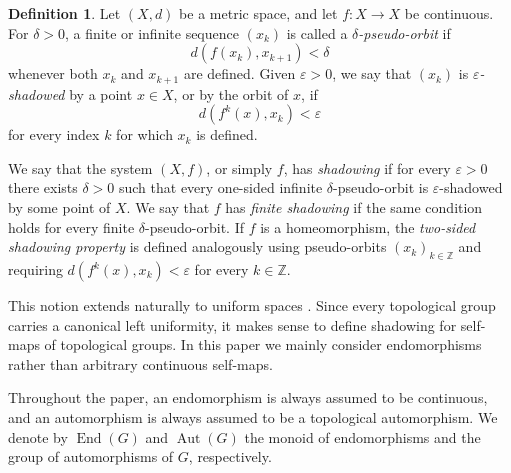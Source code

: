 \documentclass[12pt]{amsart}
\theoremstyle{definition}
\newtheorem{definition}[theorem]{Definition}
\numberwithin{equation}{section}
\theoremstyle{remark}
\begin{document}
\begin{definition}
Let $(X,d)$ be a metric space, and let $f:X\to X$ be continuous. For
$\delta>0$, a finite or infinite sequence $(x_k)$ is called a
\emph{$\delta$-pseudo-orbit} if
\[
d(f(x_k),x_{k+1})<\delta
\]
whenever both $x_k$ and $x_{k+1}$ are defined. Given $\varepsilon>0$, we say
that $(x_k)$ is \emph{$\varepsilon$-shadowed} by a point $x\in X$, or by the
orbit of $x$, if
\[
d(f^k(x),x_k)<\varepsilon
\]
for every index $k$ for which $x_k$ is defined.

We say that the system $(X,f)$, or simply $f$, has \emph{shadowing} if for
every $\varepsilon>0$ there exists $\delta>0$ such that every one-sided
infinite $\delta$-pseudo-orbit is $\varepsilon$-shadowed by some point of
$X$. We say that $f$ has \emph{finite shadowing} if the same condition holds
for every finite $\delta$-pseudo-orbit. If $f$ is a homeomorphism, the
\emph{two-sided shadowing property} is defined analogously using
pseudo-orbits $(x_k)_{k\in\mathbb Z}$ and requiring
$d(f^k(x),x_k)<\varepsilon$ for every $k\in\mathbb Z$.
\end{definition}

This notion extends naturally to uniform spaces \cite{YanZeng}. Since every topological
group carries a canonical left uniformity, it makes sense to define
shadowing for self-maps of topological groups. In this paper we mainly
consider endomorphisms rather than arbitrary continuous self-maps.

Throughout the paper, an endomorphism is always assumed to be continuous,
and an automorphism is always assumed to be a topological automorphism. We
denote by $\operatorname{End}(G)$ and $\operatorname{Aut}(G)$ the monoid of
endomorphisms and the group of automorphisms of $G$, respectively.
\end{document}

